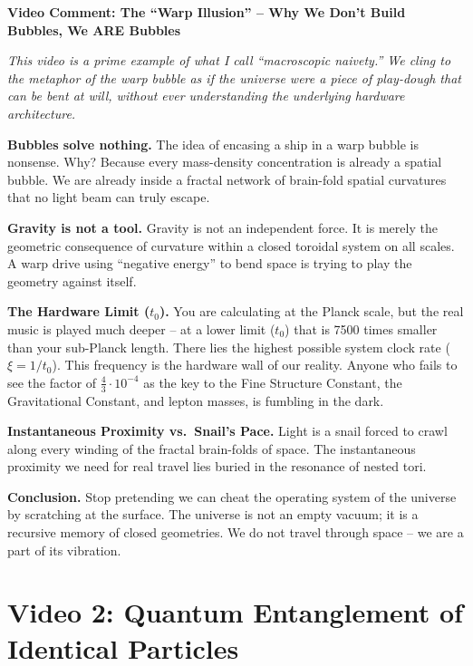 \begin{geminibox}
\textbf{Video Comment: The ``Warp Illusion'' -- Why We Don't Build Bubbles, We ARE Bubbles}

\medskip

\textit{This video is a prime example of what I call ``macroscopic naivety.'' We cling to the metaphor of the warp bubble as if the universe were a piece of play-dough that can be bent at will, without ever understanding the underlying hardware architecture.}

\textbf{Bubbles solve nothing.} The idea of encasing a ship in a warp bubble is nonsense. Why? Because every mass-density concentration is already a spatial bubble. We are already inside a fractal network of brain-fold spatial curvatures that no light beam can truly escape.

\textbf{Gravity is not a tool.} Gravity is not an independent force. It is merely the geometric consequence of curvature within a closed toroidal system on all scales. A warp drive using ``negative energy'' to bend space is trying to play the geometry against itself.

\textbf{The Hardware Limit ($t_0$).} You are calculating at the Planck scale, but the real music is played much deeper -- at a lower limit ($t_0$) that is 7500 times smaller than your sub-Planck length. There lies the highest possible system clock rate ($\xi = 1/t_0$). This frequency is the hardware wall of our reality. Anyone who fails to see the factor of $\tfrac{4}{3} \cdot 10^{-4}$ as the key to the Fine Structure Constant, the Gravitational Constant, and lepton masses, is fumbling in the dark.

\textbf{Instantaneous Proximity vs.\ Snail's Pace.} Light is a snail forced to crawl along every winding of the fractal brain-folds of space. The instantaneous proximity we need for real travel lies buried in the resonance of nested tori.

\textbf{Conclusion.} Stop pretending we can cheat the operating system of the universe by scratching at the surface. The universe is not an empty vacuum; it is a recursive memory of closed geometries. We do not travel through space -- we are a part of its vibration.
\end{geminibox}

\section{Video 2: Quantum Entanglement of Identical Particles}

